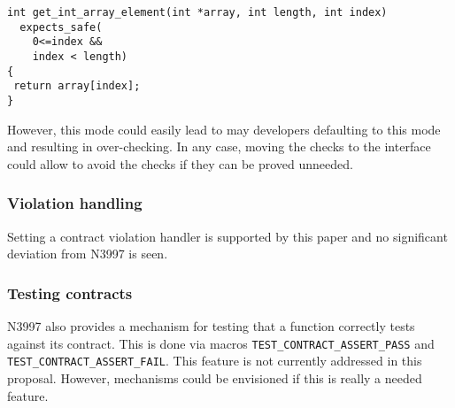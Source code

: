 \begin{lstlisting}
int get_int_array_element(int *array, int length, int index) 
  expects_safe(
    0<=index &&
    index < length)
{ 
 return array[index]; 
} 
\end{lstlisting}

However, this mode could easily lead to may developers defaulting to this mode
and resulting in over-checking. In any case, moving the checks to the interface
could allow to avoid the checks if they can be proved unneeded.

\subsubsection{Violation handling}

Setting a contract violation handler is supported by this paper and no
significant deviation from N3997 is seen.

\subsubsection{Testing contracts}

N3997 also provides a mechanism for testing that a function correctly tests
against its contract. This is done via macros 
\texttt{TEST\_CONTRACT\_ASSERT\_PASS} and
\texttt{TEST\_CONTRACT\_ASSERT\_FAIL}.
This feature is not currently addressed in this proposal. However, mechanisms
could be envisioned if this is really a needed feature. 
